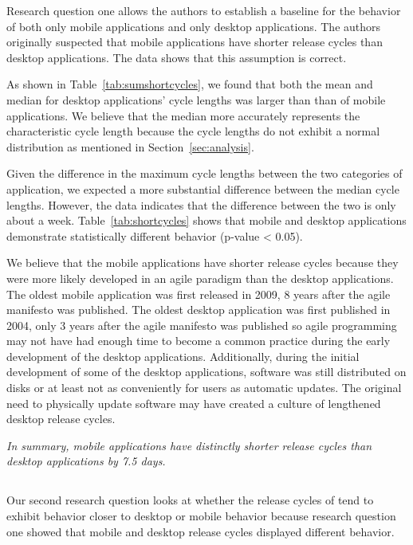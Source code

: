 \documentclass{acm_proc_article-sp}
\begin{document}

\label{tab:shortcycles}


Research question one allows the authors to establish a baseline for the behavior of both only mobile applications and only desktop applications.
The authors originally suspected that mobile applications have shorter release cycles than desktop applications.
The data shows that this assumption is correct. 

As shown in Table~\ref{tab:sumshortcycles}, we found that both the mean and median for desktop applications' cycle lengths was larger than than of mobile applications. 
We believe that the median more accurately represents the characteristic cycle length because the cycle lengths do not exhibit a normal distribution as mentioned in Section~\ref{sec:analysis}. 

Given the difference in the maximum cycle lengths between the two categories of application, we expected a more substantial difference between the median cycle lengths.
However, the data indicates that the difference between the two is only about a week.
Table~\ref{tab:shortcycles} shows that mobile and desktop applications demonstrate statistically different behavior (p-value < 0.05).

We believe that the mobile applications have shorter release cycles because they were more likely developed in an agile paradigm than the desktop applications. 
The oldest mobile application was first released in 2009, 8 years after the agile manifesto was published. 
The oldest desktop application was first published in 2004, only 3 years after the agile manifesto was published so agile programming may not have had enough time to become a common practice during the early development of the desktop applications.
Additionally, during the initial development of some of the desktop applications, software was still distributed on disks or at least not as conveniently for users as automatic updates. 
The original need to physically update software may have created a culture of lengthened desktop release cycles.



\textit{In summary, mobile applications have distinctly shorter release cycles than desktop applications by 7.5 days.}


\subsection{\RQTwo }
Our second research question looks at whether the release cycles of \sibs tend to exhibit behavior closer to desktop or mobile behavior because research question one showed that mobile and desktop release cycles displayed different behavior.
\end{document}
